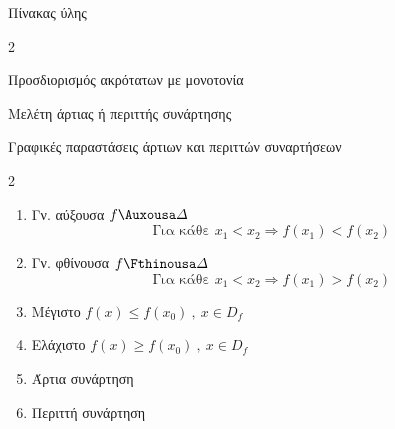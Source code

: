 \documentclass[twoside,nofonts,internet,math,spyros]{frontisthrio}
\begin{document}
\begin{mybox}[mysubtitle]{Πίνακας ύλης}
\begin{multicols}{2}
\begin{todolist}[itemsep=0mm]
\item Προσδιορισμός ακρότατων με μονοτονία
\item Μελέτη άρτιας ή περιττής συνάρτησης
\item Γραφικές παραστάσεις άρτιων και περιττών συναρτήσεων
\end{todolist}
\end{multicols}
\begin{multicols}{2}
\begin{enumerate}[itemsep=0mm]
\item Γν. αύξουσα $ f\Auxousa\varDelta $
\[ \textrm{Για κάθε }x_1<x_2\Rightarrow f(x_1)<f(x_2) \]
\item Γν. φθίνουσα $ f\Fthinousa\varDelta $
\[ \textrm{Για κάθε }x_1<x_2\Rightarrow f(x_1)>f(x_2) \]
\item Μέγιστο $ f(x)\leq f(x_0)\ ,\ x\in D_f $
\item Ελάχιστο $ f(x)\geq f(x_0)\ ,\ x\in D_f $
\columnbreak
\item Άρτια συνάρτηση
\item Περιττή συνάρτηση
\end{enumerate}
\end{multicols}
\end{mybox}

\newpage
\end{document}
